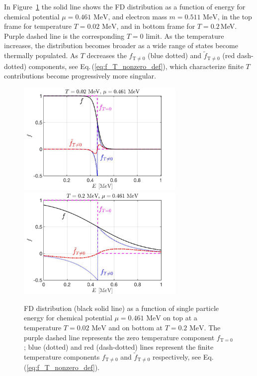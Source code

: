 \documentclass[sn-mathphys,Numbered]{sn-jnl}
\newcommand{\req}[1]{Eq.\,(\ref{#1})}
\newcommand{\rf}[1]{Figure~{\ref{#1}}}
\newcommand*{\MeV}{\text{ MeV}}
\begin{document}
In \rf{Fermi_Component}  the solid line shows the FD distribution as a function of energy for chemical potential $\mu=0.461\MeV$, and electron mass $m=0.511\MeV$, in the top frame for temperature $T=0.02\MeV$, and in bottom frame for $T=0.2$\,MeV. Purple dashed line is the corresponding $T=0$ limit. As the temperature increases, the distribution becomes broader as a wide range of states become thermally populated. As $T$ decreases the $f_\mathrm{T\neq0}$ (blue dotted) and $\widetilde f_\mathrm{T\neq0}$ (red dash-dotted) components, see \req{eq:f_T_nonzero_def}, which characterize finite $T$ contributions become progressively more singular.
 

\begin{figure}%
\centering
\includegraphics[width=0.72\textwidth]{./plot/FermiZeorFiniteTemperature}\\
\includegraphics[width=0.72\textwidth]{./plot/FermiZeroFiniteTemperature002}
\caption{
FD distribution (black solid line) as a function of single particle energy for chemical potential $\mu=0.461\MeV$ on top at a temperature $T=0.02\MeV$ and on bottom at $T=0.2\MeV$.  The purple dashed line represents the zero temperature component $f_{\mathrm{T}=0}$; blue (dotted) and red (dash-dotted) lines represent the finite temperature components $f_\mathrm{T\neq0}$ and $\widetilde f_\mathrm{T\neq0}$ respectively, see \req{eq:f_T_nonzero_def}.
}
\label{Fermi_Component}
\end{figure}
\end{document}
